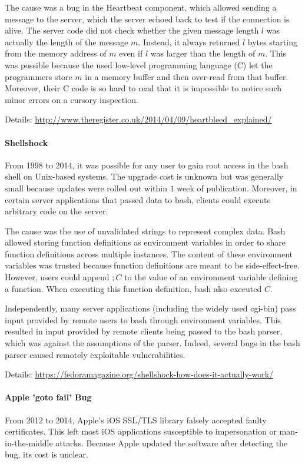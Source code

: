 The cause was a bug in the Heartbeat component, which allowed sending a message to the server, which the server echoed back to test if the connection is alive.
The server code did not check whether the given message length $l$ was actually the length of the message $m$.
Instead, it always returned $l$ bytes starting from the memory address of $m$ even if $l$ was larger than the length of $m$.
This was possible because the used low-level programming language (C) let the programmers store $m$ in a memory buffer and then over-read from that buffer.
Moreover, their C code is so hard to read that it is impossible to notice such minor errors on a cursory inspection.

Details: \url{http://www.theregister.co.uk/2014/04/09/heartbleed_explained/}

\paragraph{Shellshock}
From 1998 to 2014, it was possible for any user to gain root access in the bash shell on Unix-based systems.
The upgrade cost is unknown but was generally small because updates were rolled out within $1$ week of publication.
Moreover, in certain server applications that passed data to bash, clients could execute arbitrary code on the server.

The cause was the use of unvalidated strings to represent complex data.
Bash allowed storing function definitions as environment variables in order to share function definitions across multiple instances.
The content of these environment variables was trusted because function definitions are meant to be side-effect-free.
However, users could append $; C$ to the value of an environment variable defining a function.
When executing this function definition, bash also executed $C$.


Independently, many server applications (including the widely used cgi-bin) pass input provided by remote users to bash through environment variables.
This resulted in input provided by remote clients being passed to the bash parser, which was against the assumptions of the parser.
Indeed, several bugs in the bash parser caused remotely exploitable vulnerabilities.

Details: \url{https://fedoramagazine.org/shellshock-how-does-it-actually-work/}

\paragraph{Apple 'goto fail' Bug}
From 2012 to 2014, Apple's iOS SSL/TLS library falsely accepted faulty certificates.
This left most iOS applications susceptible to impersonation or man-in-the-middle attacks.
Because Apple updated the software after detecting the bug, its cost is unclear.

